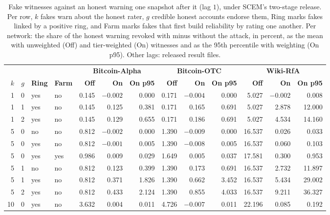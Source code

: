 \begin{table}[!t]
\centering
\scriptsize
\setlength{\tabcolsep}{3pt}
\caption{Fake witnesses against an honest warning one snapshot after it (lag $1$), under SCEM's two-stage release. Per row, $k$ fakes warn about the honest rater, $g$ credible honest accounts endorse them, Ring marks fakes linked by a positive ring, and Farm marks fakes that first build reliability by rating one another. Per network: the share of the honest warning revoked with minus without the attack, in percent, as the mean with unweighted (Off) and tier-weighted (On) witnesses and as the 95th percentile with weighting (On p95). Other lags: released result files.}
\label{tab:s_s_witness_attack}
\begin{tabular}{@{}rrllrrrrrrrrr@{}}
\toprule
 &  &  &  & \multicolumn{3}{c}{\textbf{Bitcoin-Alpha}} & \multicolumn{3}{c}{\textbf{Bitcoin-OTC}} & \multicolumn{3}{c}{\textbf{Wiki-RfA}} \\
\cmidrule(lr){5-7}\cmidrule(lr){8-10}\cmidrule(lr){11-13}
\textbf{$k$} & \textbf{$g$} & \textbf{Ring} & \textbf{Farm} & \textbf{Off} & \textbf{On} & \textbf{On p95} & \textbf{Off} & \textbf{On} & \textbf{On p95} & \textbf{Off} & \textbf{On} & \textbf{On p95} \\
\midrule
1 & 0 & yes & no & 0.145 & $-0.002$ & 0.000 & 0.171 & $-0.004$ & 0.000 & 5.027 & $-0.002$ & 0.008 \\
1 & 1 & yes & no & 0.145 & 0.125 & 0.381 & 0.171 & 0.165 & 0.691 & 5.027 & 2.878 & 12.000 \\
1 & 2 & yes & no & 0.145 & 0.129 & 0.655 & 0.171 & 0.186 & 0.691 & 5.027 & 4.534 & 14.160 \\
5 & 0 & no & no & 0.812 & $-0.002$ & 0.000 & 1.390 & $-0.009$ & 0.000 & 16.537 & 0.026 & 0.033 \\
5 & 0 & yes & no & 0.812 & $-0.001$ & 0.005 & 1.390 & $-0.008$ & 0.005 & 16.537 & 0.060 & 0.103 \\
5 & 0 & yes & yes & 0.986 & 0.009 & 0.029 & 1.649 & 0.005 & 0.037 & 17.581 & 0.300 & 0.953 \\
5 & 1 & no & no & 0.812 & 0.123 & 0.399 & 1.390 & 0.173 & 0.691 & 16.537 & 2.732 & 11.897 \\
5 & 1 & yes & no & 0.812 & 0.371 & 1.826 & 1.390 & 0.662 & 3.452 & 16.537 & 5.434 & 29.002 \\
5 & 2 & yes & no & 0.812 & 0.433 & 2.124 & 1.390 & 0.855 & 4.033 & 16.537 & 9.211 & 36.327 \\
10 & 0 & yes & no & 3.632 & 0.004 & 0.011 & 4.726 & $-0.007$ & 0.011 & 22.196 & 0.085 & 0.192 \\

\end{tabular}
\end{table}

